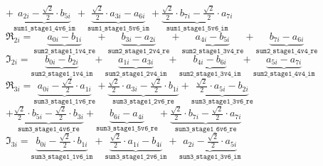 \vspace{0.4cm}
\hspace{0.3cm} $+ \underbrace{a_{2i} -\frac{\sqrt{2}}{2} \cdot b_{5i}}_{\texttt{sum1\_stage1\_4v6\_im}} + \underbrace{\frac{\sqrt{2}}{2} \cdot a_{3i} -a_{6i}}_{\texttt{sum1\_stage1\_5v6\_im}} + \underbrace{\frac{\sqrt{2}}{2} \cdot b_{7i} -\frac{\sqrt{2}}{2} \cdot a_{7i}}_{\texttt{sum1\_stage1\_5v6\_im}}$\\


\vspace{1cm}
\noindent$\Re_{2i} = \underbrace{a_{0i} -b_{1i}}_{\texttt{sum2\_stage1\_1v4\_re}} + \underbrace{b_{3i} -a_{2i}}_{\texttt{sum2\_stage1\_2v4\_re}} + \underbrace{a_{4i} -b_{5i}}_{\texttt{sum2\_stage1\_3v4\_re}} + \underbrace{b_{7i} -a_{6i}}_{\texttt{sum2\_stage1\_4v4\_re}}$\\

\vspace{0.5cm}
\noindent$\Im_{2i} = \underbrace{b_{0i} -b_{2i}}_{\texttt{sum2\_stage1\_1v4\_im}} + \underbrace{a_{1i} -a_{3i}}_{\texttt{sum2\_stage1\_2v4\_im}} + \underbrace{b_{4i} -b_{6i}}_{\texttt{sum2\_stage1\_3v4\_im}} + \underbrace{a_{5i} -a_{7i}}_{\texttt{sum2\_stage1\_4v4\_im}}$\\

\vspace{1cm}
\noindent$\Re_{3i} = \underbrace{a_{0i} -\frac{\sqrt{2}}{2} \cdot a_{1i}}_{\texttt{sum3\_stage1\_1v6\_re}} + \underbrace{\frac{\sqrt{2}}{2} \cdot a_{3i} -\frac{\sqrt{2}}{2} \cdot b_{1i}}_{\texttt{sum3\_stage1\_2v6\_re}} + \underbrace{\frac{\sqrt{2}}{2} \cdot a_{5i} -b_{2i}}_{\texttt{sum3\_stage1\_3v6\_re}}$\\

\vspace{0.4cm}
\hspace{0.3cm}$+ \underbrace{\frac{\sqrt{2}}{2} \cdot b_{5i} -\frac{\sqrt{2}}{2} \cdot b_{3i}}_{\texttt{sum3\_stage1\_4v6\_re}} + \underbrace{b_{6i} -a_{4i}}_{\texttt{sum3\_stage1\_5v6\_re}} + \underbrace{\frac{\sqrt{2}}{2} \cdot b_{7i} -\frac{\sqrt{2}}{2} \cdot a_{7i}}_{\texttt{sum3\_stage1\_6v6\_re}}$\\

\vspace{0.5cm}
\noindent$\Im_{3i} = \underbrace{b_{0i} -\frac{\sqrt{2}}{2} \cdot b_{1i}}_{\texttt{sum3\_stage1\_1v6\_im}} + \underbrace{\frac{\sqrt{2}}{2} \cdot a_{1i} -b_{4i}}_{\texttt{sum3\_stage1\_2v6\_im}} + \underbrace{a_{2i} -\frac{\sqrt{2}}{2} \cdot a_{5i}}_{\texttt{sum3\_stage1\_3v6\_im}}$\\

